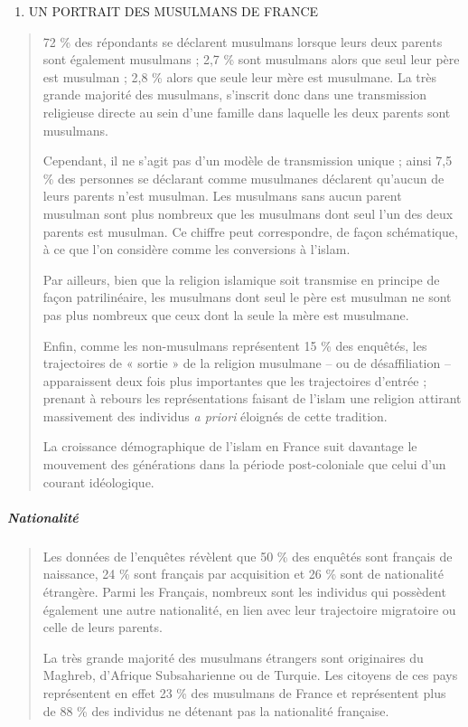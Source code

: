 \begin{enumerate}
\def\labelenumi{\Roman{enumi}.}
\item
  UN PORTRAIT DES MUSULMANS DE FRANCE
\end{enumerate}

\begin{quote}
72 \% des répondants se déclarent musulmans lorsque leurs deux parents
sont également musulmans ; 2,7 \% sont musulmans alors que seul leur
père est musulman ; 2,8 \% alors que seule leur mère est musulmane. La
très grande majorité des musulmans, s'inscrit donc dans une transmission
religieuse directe au sein d'une famille dans laquelle les deux parents
sont musulmans.

Cependant, il ne s'agit pas d'un modèle de transmission unique ; ainsi
7,5 \% des personnes se déclarant comme musulmanes déclarent qu'aucun de
leurs parents n'est musulman. Les musulmans sans aucun parent musulman
sont plus nombreux que les musulmans dont seul l'un des deux parents est
musulman. Ce chiffre peut correspondre, de façon schématique, à ce que
l'on considère comme les conversions à l'islam.

Par ailleurs, bien que la religion islamique soit transmise en principe
de façon patrilinéaire, les musulmans dont seul le père est musulman ne
sont pas plus nombreux que ceux dont la seule la mère est musulmane.

Enfin, comme les non-musulmans représentent 15 \% des enquêtés, les
trajectoires de « sortie » de la religion musulmane -- ou de
désaffiliation --apparaissent deux fois plus importantes que les
trajectoires d'entrée ; prenant à rebours les représentations faisant de
l'islam une religion attirant massivement des individus \emph{a priori}
éloignés de cette tradition.

La croissance démographique de l'islam en France suit davantage le
mouvement des générations dans la période post-coloniale que celui d'un
courant idéologique.
\end{quote}

\hypertarget{nationalituxe9}{%
\subparagraph{Nationalité}\label{nationalituxe9}}

\begin{quote}
Les données de l'enquêtes révèlent que 50 \% des enquêtés sont français
de naissance, 24 \% sont français par acquisition et 26 \% sont de
nationalité étrangère. Parmi les Français, nombreux sont les individus
qui possèdent également une autre nationalité, en lien avec leur
trajectoire migratoire ou celle de leurs parents.

La très grande majorité des musulmans étrangers sont originaires du
Maghreb, d'Afrique Subsaharienne ou de Turquie. Les citoyens de ces pays
représentent en effet 23 \% des musulmans de France et représentent plus
de 88 \% des individus ne détenant pas la nationalité française.


\end{quote}

